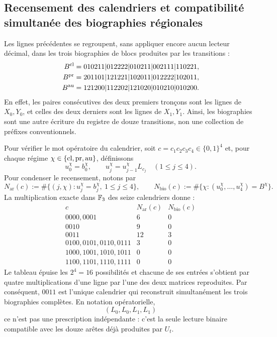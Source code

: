 \subsection{Recensement des calendriers et compatibilité simultanée des biographies régionales}
Les lignes précédentes se regroupent, sans appliquer encore aucun lecteur décimal,
dans les trois biographies de blocs produites par les transitions :
\begin{align}
 B^{\rm cl}
  &=010211|012222|010211|002111|110221,\notag\\
 B^{\rm pr}
  &=201101|121221|102011|012222|102011,
 \label{act21:eq:biografias-tpk-tres-caracteres}\\
 B^{\rm au}
  &=121200|112202|121020|010210|010200.\notag
\end{align}
En effet, les paires consécutives des deux premiers tronçons sont les lignes de \(X_0,Y_0\), et celles des deux derniers sont les lignes de \(X_1,Y_1\). Ainsi, les biographies sont une autre écriture du registre de douze transitions, non une collection de préfixes conventionnels.

Pour vérifier le mot opératoire du calendrier, soit
\(c=c_1c_2c_3c_4\in\{0,1\}^4\) et, pour chaque régime
\(\chi\in\{{\rm cl},{\rm pr},{\rm au}\}\), définissons
\[
 u_0^\chi=b_0^\chi,\qquad
 u_j^\chi=u_{j-1}^\chi L_{c_j}\quad(1\le j\le4).
\]
Pour condenser le recensement, notons par
\[
 N_{\mathrm{ar}}(c):=
 \#\{(j,\chi):u_j^\chi=b_j^\chi,\ 1\le j\le4\},\qquad
 N_{\mathrm{bio}}(c):=
 \#\{\chi:(u_0^\chi,\ldots,u_4^\chi)=B^\chi\}.
\]
La multiplication exacte dans \(\mathbb F_3\) des seize calendriers donne :
\[
\begin{array}{c|c|c}
 c&N_{\mathrm{ar}}(c)&N_{\mathrm{bio}}(c)\\ \hline
0000,0001&6&0\\
0010&9&0\\
0011&12&3\\
0100,0101,0110,0111&3&0\\
1000,1001,1010,1011&0&0\\
1100,1101,1110,1111&0&0
\end{array}
\tag{D}
\label{act21:eq:censo-dieciseis-calendarios}
\]
Le tableau épuise les \(2^4=16\) possibilités et chacune de ses entrées s'obtient
par quatre multiplications d'une ligne par l'une des deux matrices reproduites.
Par conséquent, \(0011\) est l'unique calendrier qui reconstruit
simultanément les trois biographies complètes. En notation opératorielle,
\begin{equation}
 (L_0,L_0,L_1,L_1)
 \label{act21:eq:calendario-0011-interno}
\end{equation}
ce n'est pas une prescription indépendante : c'est la seule lecture binaire compatible
avec les douze arêtes déjà produites par \(U_t\).

